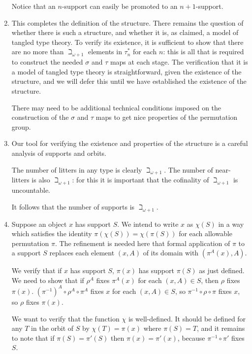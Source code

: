 \documentclass[12pt]{article}
\begin{document}
\begin{enumerate}
Notice that an $n$-support can easily be promoted to an $n+1$-support.

\item This completes the definition of the structure.  There remains the question of whether there is such a structure, and whether it is, as claimed, a model of tangled type theory.
To verify its existence, it is sufficient to show that there are no more than $\beth_{\omega+1}$ elements in $\tau^*_n$ for each $n$:  this is all that is required to construct the needed $\sigma$ and $\tau$ maps at each stage.  The verification that it is a model of tangled type theory is straightforward, given the existence of the structure, and we will defer this until we have established the existence of the structure.

There may need to be additional technical conditions imposed on the construction of the $\sigma$ and $\tau$ maps to get nice properties of the permutation group.





\item  Our tool for verifying the existence and properties of the structure is a careful analysis of supports and orbits.

The number of litters in any type is clearly $\beth_{\omega+1}$.  The number of near-litters is also $\beth_{\omega+1}$:  for this it is important that the cofinality of $\beth_{\omega+1}$ is uncountable.

It follows that the number of supports is $\beth_{\omega+1}$.

\item Suppose an object $x$ has support $S$.  We intend to write $x$ as $\chi(S)$ in a way which satisfies the identity $\pi(\chi(S)) = \chi(\pi(S))$ for each allowable permutation $\pi$.  The refinement is needed
here that formal application of $\pi$ to a support $S$ replaces each element $(x,A)$ of its domain with  $(\pi^A(x),A)$. 

We verify that if $x$ has support $S$, $\pi(x)$ has support $\pi(S)$ as just defined.  We need to show that if $\rho^A$ fixes $\pi^A(x)$ for each $(x,A) \in S$, then $\rho$ fixes $\pi(x)$.
$(\pi^{-1})^A \circ \rho^A \circ \pi^A$ fixes $x$ for each $(x,A) \in S$, so $\pi^{-1}\circ\rho\circ \pi$ fixes $x$, so $\rho$ fixes $\pi(x)$.

We want to verify that the function $\chi$ is well-defined.  It should be defined for any $T$ in the orbit of $S$ by $\chi(T) = \pi(x)$ where $\pi(S)=T$, and it remains to note that if $\pi(S) = \pi'(S)$ then
$\pi(x) = \pi'(x)$, because $\pi^{-1} \circ \pi'$ fixes $S$. 


\end{enumerate}
\end{document}
